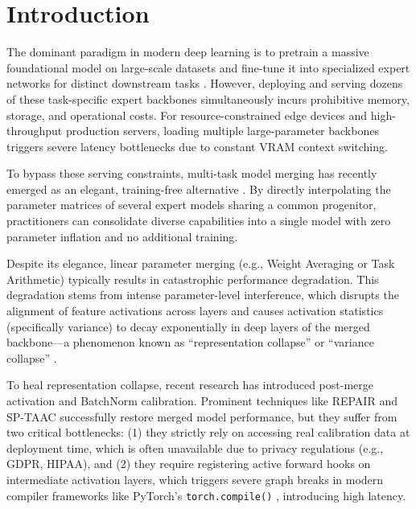 \documentclass{article}
\theoremstyle{plain}
\theoremstyle{definition}
\theoremstyle{remark}
\begin{document}
\section{Introduction}
\label{sec:intro}

The dominant paradigm in modern deep learning is to pretrain a massive foundational model on large-scale datasets \cite{Deng2009} and fine-tune it into specialized expert networks for distinct downstream tasks \cite{Vaswani2017, Devlin2018, Neyshabur2020}. However, deploying and serving dozens of these task-specific expert backbones simultaneously incurs prohibitive memory, storage, and operational costs. For resource-constrained edge devices and high-throughput production servers, loading multiple large-parameter backbones triggers severe latency bottlenecks due to constant VRAM context switching.

To bypass these serving constraints, multi-task model merging has recently emerged as an elegant, training-free alternative \cite{Wortsman2022, Ilharco2023, Choshen2022}. By directly interpolating the parameter matrices of several expert models sharing a common progenitor, practitioners can consolidate diverse capabilities into a single model with zero parameter inflation and no additional training.

Despite its elegance, linear parameter merging (e.g., Weight Averaging or Task Arithmetic) typically results in catastrophic performance degradation. This degradation stems from intense parameter-level interference, which disrupts the alignment of feature activations across layers and causes activation statistics (specifically variance) to decay exponentially in deep layers of the merged backbone---a phenomenon known as ``representation collapse'' or ``variance collapse'' \cite{Jordan2023}.

To heal representation collapse, recent research has introduced post-merge activation and BatchNorm calibration. Prominent techniques like REPAIR \cite{Jordan2023} and SP-TAAC \cite{Patil2024} successfully restore merged model performance, but they suffer from two critical bottlenecks: (1) they strictly rely on accessing real calibration data at deployment time, which is often unavailable due to privacy regulations (e.g., GDPR, HIPAA), and (2) they require registering active forward hooks on intermediate activation layers, which triggers severe graph breaks in modern compiler frameworks like PyTorch's \texttt{torch.compile()} \cite{Paszke2019}, introducing high latency.
\end{document}
